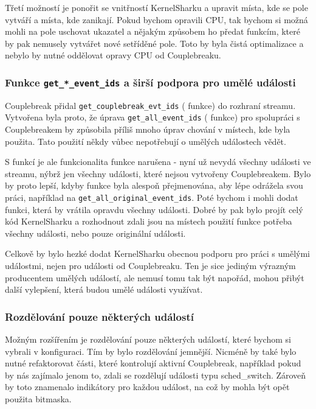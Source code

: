 Třetí možností je ponořit se vnitřností KernelSharku a upravit místa, kde se pole vytváří a místa, kde zanikají. Pokud bychom opravili CPU, tak bychom si možná mohli na pole uschovat ukazatel a nějakým způsobem ho předat funkcím, které by pak nemusely vytvářet nové setříděné pole. Toto by byla čistá optimalizace a nebylo by nutné oddělovat opravy CPU od Couplebreaku.

\subsubsection*{Funkce \texttt{get\_*\_event\_ids} a širší podpora pro umělé události}
Couplebreak přidal \texttt{get\_couplebreak\_evt\_ids} ( funkce) do rozhraní streamu. Vytvořena byla proto, že úprava \texttt{get\_all\_event\_ids} ( funkce) pro spolupráci s Couplebreakem by způsobila příliš mnoho úprav chování v místech, kde byla použita. Tato použití někdy vůbec nepotřebují o umělých událostech vědět.

S  funkcí je ale funkcionalita  funkce narušena - nyní už nevydá všechny události ve streamu, nýbrž jen všechny události, které nejsou vytvořeny Couplebreakem. Bylo by proto lepší, kdyby  funkce byla alespoň přejmenována, aby lépe odrážela svou práci, například na \texttt{get\_all\_original\_event\_ids}. Poté bychom i mohli dodat funkci, která by vrátila opravdu všechny události. Dobré by pak bylo projít celý kód KernelSharku a rozhodnout zdali jsou na místech použití  funkce potřeba všechny události, nebo pouze originální události.

Celkově by bylo hezké dodat KernelSharku obecnou podporu pro práci s umělými událostmi, nejen pro události od Couplebreaku. Ten je sice jediným výrazným producentem umělých událostí, ale nemusí tomu tak být napořád, mohou přibýt další vylepšení, která budou umělé události využívat.

\subsubsection*{Rozdělování pouze některých událostí}
Možným rozšířením je rozdělování pouze některých událostí, které bychom si vybrali v konfiguraci. Tím by bylo rozdělování jemnější. Nicméně by také bylo nutné refaktorovat části, které kontrolují aktivní Couplebreak, například pokud by nás zajímalo jenom to, zdali se rozdělují události typu sched\_switch. Zároveň by toto znamenalo indikátory pro každou událost, na což by mohla být opět použita bitmaska.

